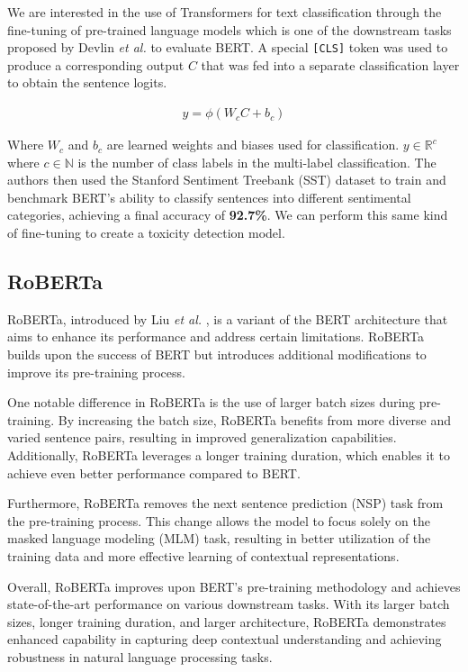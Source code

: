 We are interested in the use of Transformers for text classification through the fine-tuning of pre-trained language models which is one of the downstream tasks proposed by Devlin \textit{et al.} to evaluate BERT. A special \verb|[CLS]| token was used to produce a corresponding output $C$ that was fed into a separate classification layer to obtain the sentence logits.

\begin{equation}
    \begin{gathered}
        y = \phi\left( W_{c}C+b_{c} \right)
    \end{gathered}
    \label{eq:bert_classification}
\end{equation}

Where $W_{c}$ and $b_{c}$ are learned weights and biases used for classification. $y \in \mathbb{R}^c$ where $c \in \mathbb{N}$ is the number of class labels in the multi-label classification. The authors then used the Stanford Sentiment Treebank (SST) dataset to train and benchmark BERT's ability to classify sentences into different sentimental categories, achieving a final accuracy of \textbf{92.7\%}. We can perform this same kind of fine-tuning to create a toxicity detection model.

\subsection{RoBERTa}

RoBERTa, introduced by Liu \textit{et al.} \cite{RoBERTa}, is a variant of the BERT architecture that aims to enhance its performance and address certain limitations. RoBERTa builds upon the success of BERT but introduces additional modifications to improve its pre-training process.

One notable difference in RoBERTa is the use of larger batch sizes during pre-training. By increasing the batch size, RoBERTa benefits from more diverse and varied sentence pairs, resulting in improved generalization capabilities. Additionally, RoBERTa leverages a longer training duration, which enables it to achieve even better performance compared to BERT.

Furthermore, RoBERTa removes the next sentence prediction (NSP) task from the pre-training process. This change allows the model to focus solely on the masked language modeling (MLM) task, resulting in better utilization of the training data and more effective learning of contextual representations.

Overall, RoBERTa improves upon BERT's pre-training methodology and achieves state-of-the-art performance on various downstream tasks. With its larger batch sizes, longer training duration, and larger architecture, RoBERTa demonstrates enhanced capability in capturing deep contextual understanding and achieving robustness in natural language processing tasks.

